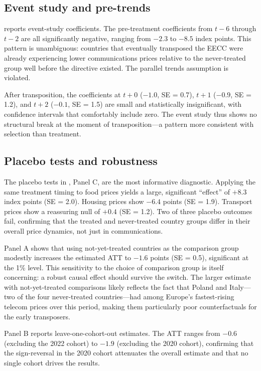 \documentclass[12pt]{article}
\begin{document}
\subsection{Event study and pre-trends}

 reports event-study coefficients. The pre-treatment coefficients from $t-6$ through $t-2$ are all significantly negative, ranging from $-2.3$ to $-8.5$ index points. This pattern is unambiguous: countries that eventually transposed the EECC were already experiencing lower communications prices relative to the never-treated group well before the directive existed. The parallel trends assumption is violated.

After transposition, the coefficients at $t+0$ ($-1.0$, SE = 0.7), $t+1$ ($-0.9$, SE = 1.2), and $t+2$ ($-0.1$, SE = 1.5) are small and statistically insignificant, with confidence intervals that comfortably include zero. The event study thus shows no structural break at the moment of transposition---a pattern more consistent with selection than treatment.



\subsection{Placebo tests and robustness}

The placebo tests in , Panel C, are the most informative diagnostic. Applying the same treatment timing to food prices yields a large, significant ``effect'' of $+8.3$ index points (SE = 2.0). Housing prices show $-6.4$ points (SE = 1.9). Transport prices show a reassuring null of $+0.4$ (SE = 1.2). Two of three placebo outcomes fail, confirming that the treated and never-treated country groups differ in their overall price dynamics, not just in communications.

Panel A shows that using not-yet-treated countries as the comparison group modestly increases the estimated ATT to $-1.6$ points (SE = 0.5), significant at the 1\% level. This sensitivity to the choice of comparison group is itself concerning: a robust causal effect should survive the switch. The larger estimate with not-yet-treated comparisons likely reflects the fact that Poland and Italy---two of the four never-treated countries---had among Europe's fastest-rising telecom prices over this period, making them particularly poor counterfactuals for the early transposers.

Panel B reports leave-one-cohort-out estimates. The ATT ranges from $-0.6$ (excluding the 2022 cohort) to $-1.9$ (excluding the 2020 cohort), confirming that the sign-reversal in the 2020 cohort attenuates the overall estimate and that no single cohort drives the results.
\end{document}
